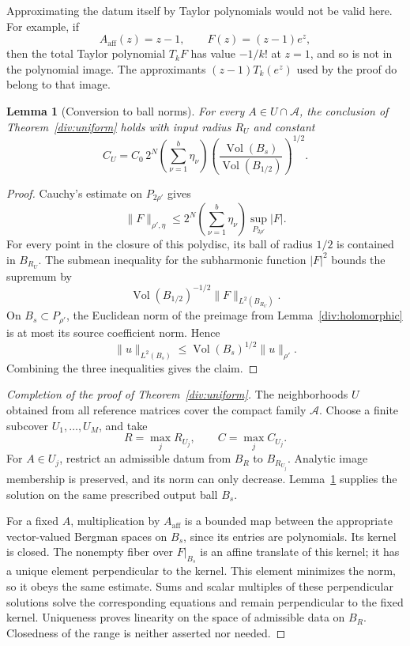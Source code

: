 \documentclass[11pt,reqno]{amsart}
\numberwithin{equation}{section}
\newtheorem{lemma}[theorem]{Lemma}
\theoremstyle{definition}
\theoremstyle{remark}
\begin{document}
Approximating the datum itself by Taylor polynomials would not be
valid here. For example, if
\[
 A_{\mathrm{aff}}(z)=z-1,\qquad F(z)=(z-1)e^z,
\]
then the total Taylor polynomial \(T_kF\) has value \(-1/k!\) at
\(z=1\), and so is not in the polynomial image. The approximants
\((z-1)T_k(e^z)\) used by the proof do belong to that image.

\begin{lemma}[Conversion to ball norms]
\label{div:ball}
For every \(A\in U\cap\mathcal A\), the conclusion of
Theorem~\ref{div:uniform} holds with input radius \(R_U\) and
constant
\[
 C_U=
 C_0\,2^N\left(\sum_{\nu=1}^b\eta_\nu\right)
 \left(\frac{\operatorname{Vol}(B_s)}
 {\operatorname{Vol}(B_{1/2})}\right)^{1/2}.
\]
\end{lemma}

\begin{proof}
Cauchy's estimate on \(P_{2\rho'}\) gives
\[
 \|F\|_{\rho',\eta}
 \leq
 2^N\left(\sum_{\nu=1}^b\eta_\nu\right)
 \sup_{P_{2\rho'}}|F|.
\]
For every point in the closure of this polydisc, its ball of
radius \(1/2\) is contained in \(B_{R_U}\). The submean inequality
for the subharmonic function \(|F|^2\) bounds the supremum by
\[
 \operatorname{Vol}(B_{1/2})^{-1/2}\|F\|_{L^2(B_{R_U})}.
\]
On \(B_s\subset P_{\rho'}\), the Euclidean norm of the preimage
from Lemma~\ref{div:holomorphic} is at most its source
coefficient norm. Hence
\[
 \|u\|_{L^2(B_s)}
 \leq\operatorname{Vol}(B_s)^{1/2}\|u\|_{\rho'}.
\]
Combining the three inequalities gives the claim.
\end{proof}

\begin{proof}[Completion of the proof of Theorem~\ref{div:uniform}]
The neighborhoods \(U\) obtained from all reference matrices
cover the compact family \(\mathcal A\). Choose a finite
subcover \(U_1,\ldots,U_M\), and take
\[
 R=\max_j R_{U_j},\qquad C=\max_j C_{U_j}.
\]
For \(A\in U_j\), restrict an admissible datum from \(B_R\) to
\(B_{R_{U_j}}\). Analytic image membership is preserved, and
its norm can only decrease. Lemma~\ref{div:ball} supplies the
solution on the same prescribed output ball \(B_s\).

For a fixed \(A\), multiplication by \(A_{\mathrm{aff}}\) is a
bounded map between the appropriate vector-valued Bergman
spaces on \(B_s\), since its entries are polynomials. Its
kernel is closed. The nonempty fiber over \(F|_{B_s}\) is an
affine translate of this kernel; it has a unique element
perpendicular to the kernel. This element minimizes the norm,
so it obeys the same estimate. Sums and scalar multiples of
these perpendicular solutions solve the corresponding equations
and remain perpendicular to the fixed kernel. Uniqueness proves
linearity on the space of admissible data on \(B_R\).
Closedness of the range is neither asserted nor needed.
\end{proof}
\end{document}
